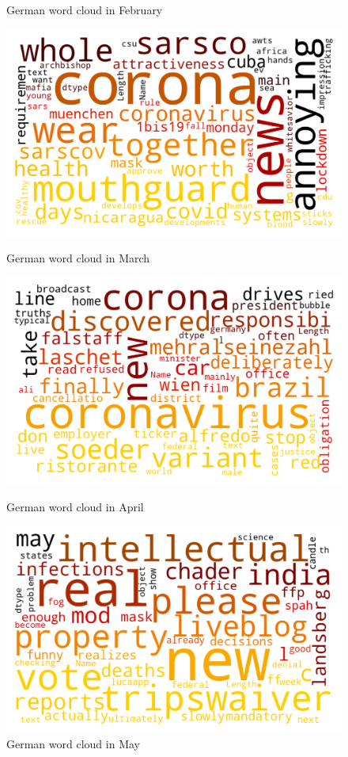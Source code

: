 \begin{landscape}
\begin{figure}[!htb]
  \caption{German word cloud in February}\label{fig:februaryde}
\endminipage
\end{figure}
\begin{figure}[!htb]
  \includegraphics[width=\linewidth]{March de word cloud.png}
  \caption{German word cloud in March}\label{fig:marchde}
\endminipage\hfill
{}
  \includegraphics[width=\linewidth]{April de word cloud.png}
  \caption{German word cloud in April}\label{fig:aprilde}
\endminipage\hfill
{}
  \includegraphics[width=\linewidth]{May de word cloud.png}
  \caption{German word cloud in May}\label{fig:mayde}
\endminipage
\end{figure}


\end{landscape}
